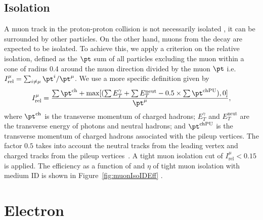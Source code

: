 \subsection{Isolation}
A muon track in the proton-proton collision is not necessarily isolated \ie, it can be 
surrounded by other particles. On the other hand, muons from the \PW decay are 
expected to be isolated. To achieve this, we apply a criterion on the relative
isolation, defined as the $\pt$ sum of all particles excluding the muon within a 
cone of radius 0.4 around the muon direction divided by the muon $\pt$ i.e.
$I_{\text{rel}}^\mu=\sum_{i\neq\mu}\pt^i/\pt^\mu$. We use a more specific definition given by  
\begin{equation}
\label{eq:mu_iso}
I_{\text{rel}}^\mu=\frac{\sum\pt^{\text{ch}}+{\text{max}}[(\sum E_T^\gamma+\sum E_T^{\text{neut}}-0.5\times\sum\pt^{\text{chPU}}),0]}{\pt^\mu},
\end{equation}
where $\pt^{\text{ch}}$ is the transverse momentum of charged hadrons; $E_T^\gamma$ and
$E_{T}^{\text{neut}}$ are the transverse energy of photons and neutral hadrons; and
$\pt^{\text{chPU}}$ is the transverse momentum of charged hadrons associated with the
pileup vertices. The factor $0.5$ takes into account the neutral tracks from the
leading vertex and charged tracks from the pileup vertices~\cite{Sirunyan:2018fpa}.
A tight muon isolation cut of $I_{\text{rel}}^\mu < 0.15$ is applied. The efficiency
as a function of \pt and $\eta$ of tight muon isolation with medium ID is shown in
Figure~\ref{fig:muonIsoIDEff} \cite{muSF}.

\section{Electron }
\label{s:eleReco}
